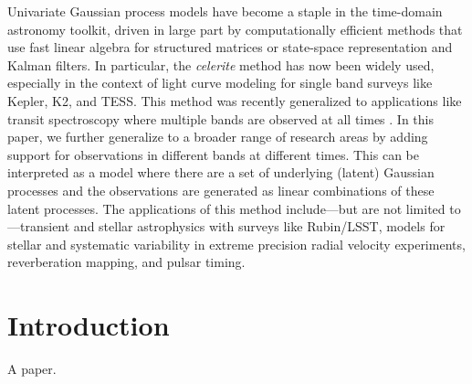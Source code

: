 \documentclass[10pt]{article}
\newcommand{\tfigurerule}{\rule{0pt}{1ex}\\ \rule{\marginparwidth}{0.5pt}\\ \rule{0pt}{0.25ex}}
\newcommand{\bfigurerule}{\rule{0pt}{0.25ex}\\ \rule{\marginparwidth}{0.5pt}\\ \rule{0pt}{1ex}}
\renewcommand{\caption}[1]{\parbox{\marginparwidth}{\footnotesize\refstepcounter{figure}\textbf{\figurename~\thefigure}: {#1}}}
\begin{document}
Univariate Gaussian process models have become a staple in the time-domain astronomy toolkit, driven in large part by computationally efficient methods that use fast linear algebra for structured matrices or state-space representation and Kalman filters.
In particular, the \emph{celerite} method \citep{foreman-mackey2017} has now been widely used, especially in the context of light curve modeling for single band surveys like Kepler, K2, and TESS.
This method was recently generalized to applications like transit spectroscopy where multiple bands are observed at all times \citep{gordon2020}.
In this paper, we further generalize to a broader range of research areas by adding support for observations in different bands at different times.
This can be interpreted as a model where there are a set of underlying (latent) Gaussian processes and the observations are generated as linear combinations of these latent processes.
The applications of this method include---but are not limited to---transient and stellar astrophysics with surveys like Rubin/LSST, models for stellar and systematic variability in extreme precision radial velocity experiments, reverberation mapping, and pulsar timing.

\section{Introduction}

A paper. \citep{foreman-mackey2017,foreman-mackey2018,gordon2020}

\citep{loper2020,hu2020}



\clearpage\raggedright

\end{document}
